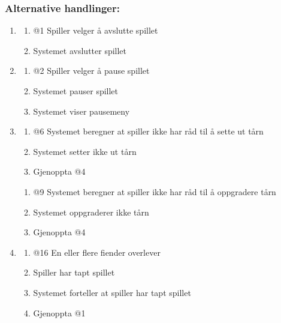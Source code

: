 \documentclass[12pt]{report}
\begin{document}
\subsubsection*{Alternative handlinger:}
\begin{enumerate}[label=\Alph*]
\item
\bigskip
\begin{enumerate}
\item @1 Spiller velger å avslutte spillet
\item Systemet avslutter spillet
\end{enumerate}

\item
\bigskip
\begin{enumerate}
\item @2 Spiller velger å pause spillet
\item Systemet pauser spillet
\item Systemet viser pausemeny
\end{enumerate}

\item
\bigskip
\begin{enumerate}
\item @6 Systemet beregner at spiller ikke har råd til å sette ut tårn
\item Systemet setter ikke ut tårn
\item Gjenoppta @4
\end{enumerate}

\bigskip
\begin{enumerate}
\item @9 Systemet beregner at spiller ikke har råd til å oppgradere tårn
\item Systemet oppgraderer ikke tårn
\item Gjenoppta @4
\end{enumerate}

\item 
\bigskip
\begin{enumerate}
\item @16 En eller flere fiender overlever
\item Spiller har tapt spillet
\item Systemet forteller at spiller har tapt spillet
\item Gjenoppta @1
\end{enumerate}
\end{enumerate}
\end{document}
